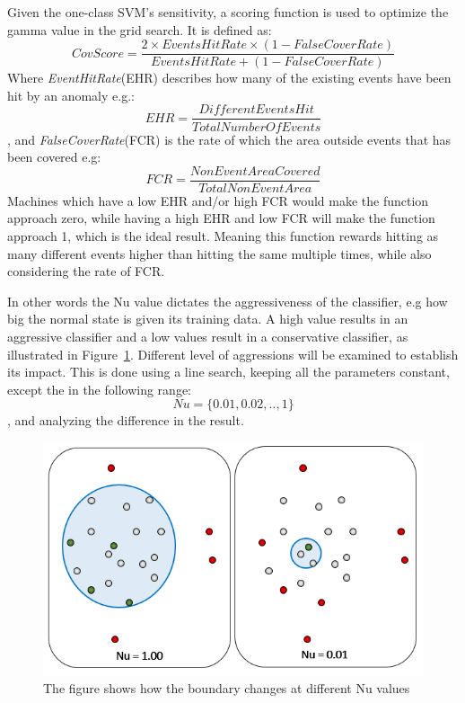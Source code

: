 Given the one-class SVM's sensitivity, a scoring function is used to optimize the gamma value in the grid search. It is defined as: 
\[CovScore = \frac{2 \times EventsHitRate \times (1-FalseCoverRate)}{EventsHitRate + (1-FalseCoverRate)}\]
Where \textit{EventHitRate}(EHR) describes how many of the existing events have been hit by an anomaly e.g.:
\[EHR = \frac{DifferentEventsHit}{TotalNumberOfEvents}\]
, and \textit{FalseCoverRate}(FCR) is the rate of which the area outside events that has been covered e.g:
\[FCR = \frac{NonEventAreaCovered}{TotalNonEventArea}\]
Machines which have a low EHR and/or high FCR would make the function approach zero, while having a high EHR and low FCR will make the function approach 1, which is the ideal result.
Meaning this function rewards hitting as many different events higher than hitting the same multiple times, while also considering the rate of FCR.

In other words the Nu value dictates the aggressiveness of the classifier, e.g how big the normal state is given its training data. A high value results in an aggressive classifier and a low values result in a conservative classifier, as illustrated in Figure~\ref{[FIGURE] nuvalues}.
Different level of aggressions will be examined to establish its impact.
This is done using a line search, keeping all the parameters constant, except the in the following range:
\[Nu = \{0.01, 0.02,.., 1\}\], and analyzing the difference in the result. 
\begin{figure}
    \centering
  \includegraphics[width=0.75\columnwidth]{graphics/nuvalues.png}
    \caption{The figure shows how the boundary changes at different Nu values}
    \label{[FIGURE] nuvalues}
\end{figure}